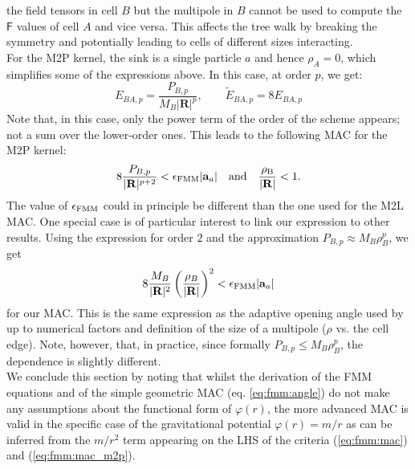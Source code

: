 the field tensors in cell $B$ but the multipole in $B$ cannot be used
to compute the $\mathsf{F}$ values of cell $A$ and vice versa. This
affects the tree walk by breaking the symmetry and potentially leading
to cells of different sizes interacting. \\
For the M2P kernel, the sink is a single particle $a$ and hence
$\rho_A = 0$, which simplifies some of the expressions above. In this
case, at order $p$, we get:
\begin{equation}
  E_{BA,p} = \frac{P_{B,p}}{M_B |\mathbf{R}|^p}, \qquad
  \tilde{E}_{BA,p} = 8E_{BA,p} \nonumber
\end{equation}
Note that, in this case, only the power term of the order of the
scheme appears; not a sum over the lower-order ones. This leads to the
following MAC for the M2P kernel:
\begin{equation}
  8\frac{P_{B,p}}{|\mathbf{R}|^{p+2}} < \epsilon_{\rm FMM} |\mathbf{a}_a| \quad
  \rm{and} \quad \frac{\rho_B} {|\mathbf{R}|} < 1.
    \label{eq:fmm:mac_m2p}  
\end{equation}
The value of $\epsilon_{\rm FMM}$ could in principle be different than the one
used for the M2L MAC. One special case is of particular interest to
link our expression to other results. Using the expression for order
$2$ and the approximation $P_{B,p} \approx M_B \rho_B^p$, we
get
\begin{equation}
  8\frac{M_B}{|\mathbf{R}|^2}\left(\frac{\rho_B}{|\mathbf{R}|}\right)^2
  < \epsilon_{\rm FMM} |\mathbf{a}_a| \nonumber
\end{equation}
for our MAC.  This is the same expression as the adaptive opening
angle used by \gadget \cite[see eq.18 of][]{Springel2005} up to
numerical factors and definition of the size of a multipole ($\rho$
vs. the cell edge). Note, however, that, in practice, since formally
$P_{B,p} \leq M_B \rho_B^p$, the dependence is slightly
different.\\
We conclude this section by noting that whilst the derivation of the
FMM equations and of the simple geometric MAC (eq. \ref{eq:fmm:angle})
do not make any assumptions about the functional form of $\varphi(r)$,
the more advanced MAC is valid in the specific case of the
gravitational potential $\varphi(r) = m/r$ as can be inferred from the
$m/r^2$ term appearing on the LHS of the criteria (\ref{eq:fmm:mac})
and (\ref{eq:fmm:mac_m2p}).
